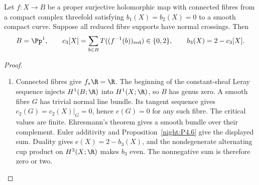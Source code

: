 \begin{proposition}\hypertarget{tag-02XZ}{}\label{night:P4.7}\label{stmt:P4.7}

Let $f:X\to B$ be a proper surjective holomorphic map with connected
fibres from a compact complex threefold satisfying $b_1(X)=b_2(X)=0$
to a smooth compact curve. Suppose all reduced fibre supports have
normal crossings. Then
\[
 B=\Pp^1,\qquad
 c_3[X]=\sum_{b\in B}T((f^{-1}(b))_{\mathrm{red}})\in\{0,2\},\qquad
 b_3(X)=2-c_3[X].
\]
\end{proposition}
\begin{proof}
\begin{enumerate}[label={$\langle1\rangle$\arabic*.},leftmargin=*]
\item Connected fibres give $f_*\R=\R$. The beginning of the constant-sheaf
Leray sequence injects $H^1(B;\R)$ into $H^1(X;\R)$, so $B$ has genus
zero. A smooth fibre $G$ has trivial normal line bundle. Its tangent
sequence gives $c_2(G)=c_2(X)|_G=0$, hence $e(G)=0$ for any such fibre.
The critical values are finite. Ehresmann's theorem gives a smooth
bundle over their complement. Euler additivity and Proposition~\ref{night:P4.6} give the
displayed sum. Duality gives $e(X)=2-b_3(X)$, and the nondegenerate
alternating cup product on $H^3(X;\R)$ makes $b_3$ even. The
nonnegative sum is therefore zero or two.

\end{enumerate}
\end{proof}